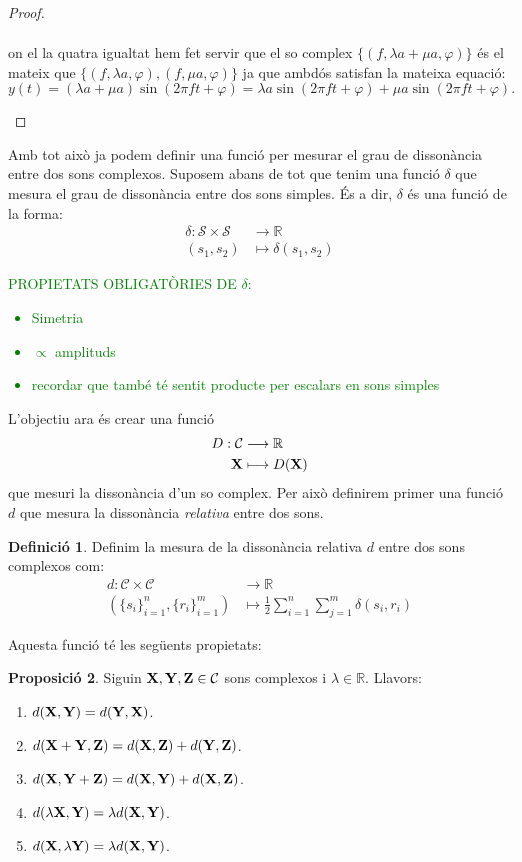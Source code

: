 \documentclass{article}
\theoremstyle{definition}
\newtheorem{definition}{Definició}[section]
\newtheorem{prop}[definition]{Proposició}
\newcommand{\0}{\ensuremath{\vb{0}}}
\newcommand{\X}{\ensuremath{\vb{X}}}
\newcommand{\Y}{\ensuremath{\vb{Y}}}
\newcommand{\Z}{\ensuremath{\vb{Z}}}
\newcommand{\RR}{\ensuremath{\mathbb{R}}} %
\begin{document}
\begin{proof}
\begin{enumerate}
\begin{multline*}
        \end{multline*}
        on el la quatra igualtat hem fet servir que el so complex $\{(f,\lambda a+\mu a,\varphi)\}$ és el mateix que $\{(f,\lambda a,\varphi),(f,\mu a,\varphi)\}$ ja que ambdós satisfan la mateixa equació: $$y(t)=(\lambda a+\mu a)\sin(2\pi ft+\varphi)=\lambda a\sin(2\pi ft+\varphi)+\mu a\sin(2\pi ft+\varphi).$$
    \end{enumerate}
\end{proof}
Amb tot això ja podem definir una funció per mesurar el grau de dissonància entre dos sons complexos. Suposem abans de tot que tenim una funció $\delta$ que mesura el grau de dissonància entre dos sons simples. És a dir, $\delta$ és una funció de la forma:
\begin{align*}
    \delta:\mathcal{S}\times\mathcal{S}&\longrightarrow\RR\\
    (s_1,s_2)&\longmapsto\delta(s_1,s_2)
\end{align*}
\textcolor{green}{PROPIETATS OBLIGATÒRIES DE $\delta$:
\begin{itemize}
    \item Simetria
    \item $\propto$ amplituds
    \item recordar que també té sentit producte per escalars en sons simples
\end{itemize}
}
L'objectiu ara és crear una funció 
\begin{align*}
    D:\mathcal{C}&\longrightarrow\RR\\
    \X&\longmapsto D(\X)
\end{align*}
que mesuri la dissonància d'un so complex. Per això definirem primer una funció $d$ que mesura la dissonància \textit{relativa} entre dos sons.
\begin{definition}
    Definim la mesura de la dissonància relativa $d$ entre dos sons complexos com:
    \begin{align*}
        d:\mathcal{C}\times\mathcal{C}&\longrightarrow\RR\\
        (\{s_i\}_{i=1}^n,\{r_i\}_{i=1}^m)&\longmapsto\frac{1}{2}\sum_{i=1}^n\sum_{j=1}^m\delta(s_i,r_i)
    \end{align*}
\end{definition}
Aquesta funció té les següents propietats:
\begin{prop}
    Siguin $\X,\Y,\Z\in\mathcal{C}$ sons complexos i $\lambda\in\RR$. Llavors:
    \begin{enumerate}
        \item $d(\X,\Y)=d(\Y,\X)$.
        \item $d(\X+\Y,\Z)=d(\X,\Z)+d(\Y,\Z)$.
        \item $d(\X,\Y+\Z)=d(\X,\Y)+d(\X,\Z)$.
        \item $d(\lambda\X,\Y)=\lambda d(\X,\Y)$.
        \item $d(\X,\lambda\Y)=\lambda d(\X,\Y)$.
    \end{enumerate}
\end{prop}
\end{document}
